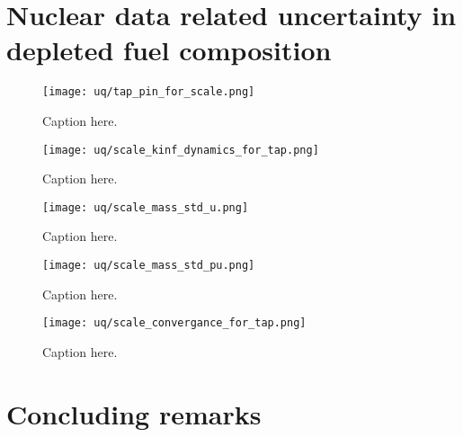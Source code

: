 \section{Nuclear data related uncertainty in depleted fuel composition}
\begin{figure}[hbp!] %
	\centering
	\texttt{[image: uq/tap\_pin\_for\_scale.png]}
	\caption{Caption here.}
	\label{fig:uq-tap-pincell}
\end{figure}
\begin{figure}[hbp!] %
	\centering
	\texttt{[image: uq/scale\_kinf\_dynamics\_for\_tap.png]}
	\caption{Caption here.}
	\label{fig:uq-scale-kinf}
\end{figure}
\begin{figure}[hbp!] %
	\centering
	\texttt{[image: uq/scale\_mass\_std\_u.png]}
	\caption{Caption here.}
	\label{fig:uq-scale-u}
\end{figure}

\begin{figure}[hbp!] %
	\centering
	\texttt{[image: uq/scale\_mass\_std\_pu.png]}
	\caption{Caption here.}
	\label{fig:uq-scale-pu}
\end{figure}

\begin{figure}[hbp!] %
	\centering
	\texttt{[image: uq/scale\_convergance\_for\_tap.png]}
	\caption{Caption here.}
	\label{fig:uq-scale-convergance}
\end{figure}

\section{Concluding remarks}